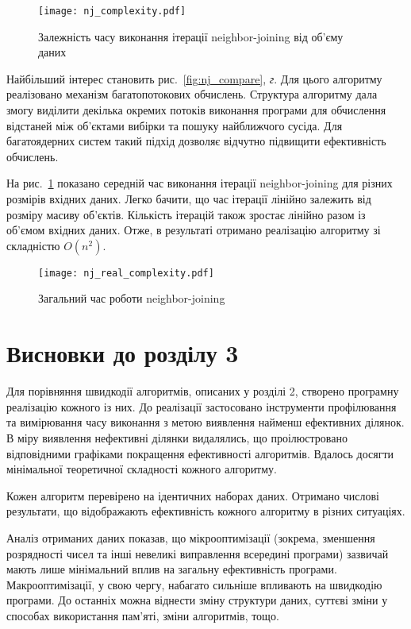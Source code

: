                 \begin{figure}
                    \centering
                    \texttt{[image: nj\_complexity.pdf]}
                    \caption{Залежність часу виконання ітерації neighbor-joining від об’єму даних}\label{fig:nj_comlexity}
                \end{figure}
                                
                Найбільший інтерес становить рис.~\ref{fig:nj_compare}, \emph{г}. Для цього алгоритму реалізовано механізм багатопотокових обчислень. Структура алгоритму дала змогу виділити декілька окремих потоків виконання програми для обчислення відстаней між об’єктами вибірки та пошуку найближчого сусіда. Для багатоядерних систем такий підхід дозволяє відчутно підвищити ефективність обчислень.

                На рис.~\ref{fig:nj_comlexity} показано середній час виконання ітерації neighbor-joining для різних розмірів вхідних даних. Легко бачити, що час ітерації лінійно залежить від розміру масиву об’єктів. Кількість ітерацій також зростає лінійно разом із об’ємом вхідних даних. Отже, в результаті отримано реалізацію алгоритму зі складністю $O(n^2)$.
                
                \begin{figure}
                    \centering
                    \texttt{[image: nj\_real\_complexity.pdf]}
                    \caption{Загальний час роботи neighbor-joining}\label{fig:nj_real_comlexity}
                \end{figure}
                
        \section{Висновки до розділу 3}
            Для порівняння швидкодії алгоритмів, описаних у розділі 2, створено програмну реалізацію кожного із них. До реалізації застосовано інструменти профілювання та вимірювання часу виконання з метою виявлення найменш ефективних ділянок. В міру виявлення нефективні ділянки видалялись, що проілюстровано відповідними графіками покращення ефективності алгоритмів. Вдалось досягти мінімальної теоретичної складності кожного алгоритму.
            
            Кожен алгоритм перевірено на ідентичних наборах даних. Отримано числові результати, що відображають ефективність кожного алгоритму в різних ситуаціях. 
                
                Аналіз отриманих даних показав, що мікрооптимізації (зокрема, зменшення розрядності чисел та інші невеликі виправлення всередині програми) зазвичай мають лише мінімальний вплив на загальну ефективність програми. Макрооптимізації, у свою чергу, набагато сильніше впливають на швидкодію програми. До останніх можна віднести зміну структури даних, суттєві зміни у способах використання пам’яті, зміни алгоритмів, тощо.
